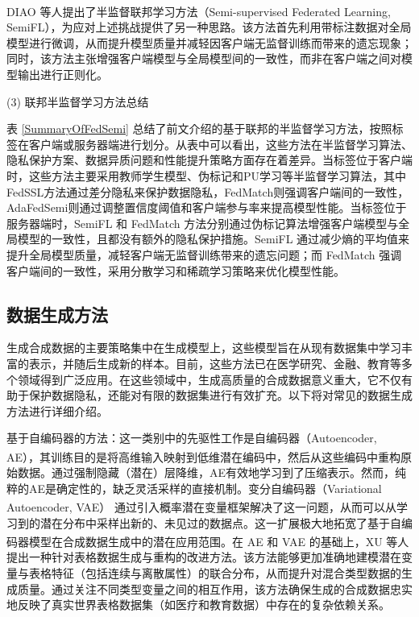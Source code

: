 DIAO 等人\textsuperscript{\cite{diao2022semifl}}提出了半监督联邦学习方法（Semi-supervised Federated Learning, SemiFL），为应对上述挑战提供了另一种思路。该方法首先利用带标注数据对全局模型进行微调，从而提升模型质量并减轻因客户端无监督训练而带来的遗忘现象；同时，该方法主张增强客户端模型与全局模型间的一致性，而非在客户端之间对模型输出进行正则化。

(3) 联邦半监督学习方法总结

表 \ref{SummaryOfFedSemi} 总结了前文介绍的基于联邦的半监督学习方法，按照标签在客户端或服务器端进行划分。从表中可以看出，这些方法在半监督学习算法、隐私保护方案、数据异质问题和性能提升策略方面存在着差异。当标签位于客户端时，这些方法主要采用教师学生模型、伪标记和PU学习等半监督学习算法，其中FedSSL方法通过差分隐私来保护数据隐私，FedMatch则强调客户端间的一致性，AdaFedSemi则通过调整置信度阈值和客户端参与率来提高模型性能。当标签位于服务器端时，SemiFL 和 FedMatch 方法分别通过伪标记算法增强客户端模型与全局模型的一致性，且都没有额外的隐私保护措施。SemiFL 通过减少熵的平均值来提升全局模型质量，减轻客户端无监督训练带来的遗忘问题；而 FedMatch 强调客户端间的一致性，采用分散学习和稀疏学习策略来优化模型性能。



\subsection{数据生成方法}
生成合成数据的主要策略集中在生成模型上，这些模型旨在从现有数据集中学习丰富的表示，并随后生成新的样本。目前，这些方法已在医学研究、金融、教育等多个领域得到广泛应用。在这些领域中，生成高质量的合成数据意义重大，它不仅有助于保护数据隐私，还能对有限的数据集进行有效扩充。以下将对常见的数据生成方法进行详细介绍。

基于自编码器的方法：这一类别中的先驱性工作是自编码器（Autoencoder, AE）\textsuperscript{\cite{hinton2006reducing}}，其训练目的是将高维输入映射到低维潜在编码中，然后从这些编码中重构原始数据。通过强制隐藏（潜在）层降维，AE有效地学习到了压缩表示。然而，纯粹的AE是确定性的，缺乏灵活采样的直接机制。变分自编码器（Variational Autoencoder, VAE）\textsuperscript{\cite{kingma2013auto}} 通过引入概率潜在变量框架解决了这一问题，从而可以从学习到的潜在分布中采样出新的、未见过的数据点。这一扩展极大地拓宽了基于自编码器模型在合成数据生成中的潜在应用范围。在 AE 和 VAE 的基础上，XU 等人\textsuperscript{\cite{xu2019modeling}} 提出一种针对表格数据生成与重构的改进方法。该方法能够更加准确地建模潜在变量与表格特征（包括连续与离散属性）的联合分布，从而提升对混合类型数据的生成质量。通过关注不同类型变量之间的相互作用，该方法确保生成的合成数据忠实地反映了真实世界表格数据集（如医疗和教育数据）中存在的复杂依赖关系。

